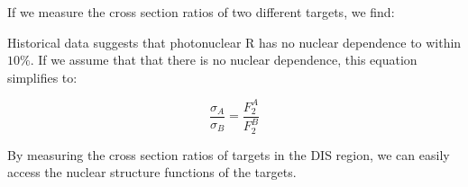 If we measure the cross section ratios of two different targets, we find:


Historical data suggests that photonuclear R has no nuclear dependence to within $10\%$. If we assume that that there is no nuclear dependence, this equation simplifies to:

\begin{equation}
	\frac{\sigma_A}{\sigma_B} = \frac{F_2^A}{F_2^B}
\end{equation}

By measuring the cross section ratios of targets in the DIS region, we can easily access the nuclear structure functions of the targets.